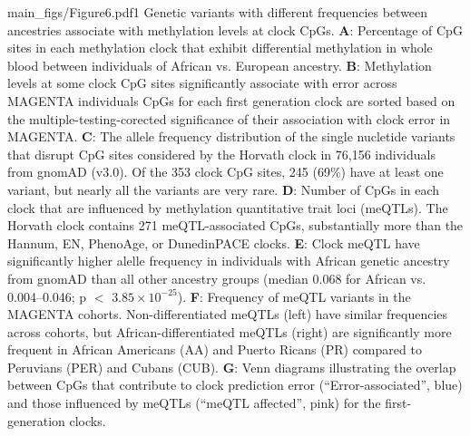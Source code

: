 {main_figs/Figure6.pdf}{1}
    {Genetic variants with different frequencies between ancestries associate with methylation levels at clock CpGs.}
    {{
        {\textbf{A}: Percentage of CpG sites in each methylation clock that exhibit differential methylation in whole blood between individuals of African vs. European ancestry.}
        {\textbf{B}: Methylation levels at some clock CpG sites significantly associate with error across MAGENTA individuals CpGs for each first generation clock are sorted based on the multiple-testing-corected significance of their association with clock error in MAGENTA.}
        {\textbf{C}: The allele frequency distribution of the single nucletide variants that disrupt CpG sites considered by the Horvath clock in 76,156 individuals from gnomAD (v3.0). Of the 353 clock CpG sites, 245 (69\%) have at least one variant, but nearly all the variants are very rare.
        }
        {\textbf{D}: Number of CpGs in each clock that are influenced by methylation quantitative trait loci (meQTLs). The Horvath clock contains 271 meQTL-associated CpGs, substantially more than the Hannum, EN, PhenoAge, or DunedinPACE clocks.
        }
        {\textbf{E}: Clock meQTL have significantly higher alelle frequency in individuals with African genetic ancestry from gnomAD than all other ancestry groups (median 0.068 for African vs. 0.004--0.046; p $<$ $3.85 \times 10^{-25}$).}
        {\textbf{F}: Frequency of meQTL variants in the MAGENTA cohorts. Non-differentiated meQTLs (left) have similar frequencies across cohorts, but African-differentiated meQTLs (right) are significantly more frequent in African Americans (AA) and Puerto Ricans (PR) compared to Peruvians (PER) and Cubans (CUB).}
        {\textbf{G}: Venn diagrams illustrating the overlap between CpGs that contribute to clock prediction error (``Error-associated'', blue) and those influenced by meQTLs (``meQTL affected'', pink) for the first-generation clocks.}
    }}